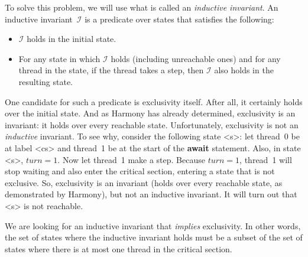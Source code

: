 \documentclass{report}
\begin{document}
To solve this problem, we will use what is called an
\emph{inductive invariant}.
%
An inductive invariant~$\mathcal{I}$ is a predicate over states that satisfies the following:
\begin{itemize}
\item $\mathcal{I}$ holds in the initial state.
\item For any state in which $\mathcal{I}$ holds (including unreachable ones) and for any
thread in the state, if the thread takes a step, then $\mathcal{I}$ also holds in the
resulting state.
\end{itemize}

One candidate for such a predicate is exclusivity itself.
After all, it certainly holds over the initial state.
And as Harmony has already determined, exclusivity is an invariant:
it holds over every reachable state.
Unfortunately, exclusivity is not an \emph{inductive} invariant.
To see why, consider the following state <{s}>: let thread~0 be at label <{cs}>
and thread~1 be at the start of the \textbf{await} statement.
Also, in state <{s}>, $\mathit{turn} = 1$.  Now let
thread~1 make a step.  Because $\mathit{turn} = 1$,
thread~1 will stop waiting and also enter the critical
section, entering a state that is not exclusive.
So, exclusivity is an invariant (holds over every reachable state, as demonstrated
by Harmony),
but not an inductive invariant.
It will turn out that <{s}> is not reachable.

We are looking for an inductive invariant that \emph{implies} exclusivity.
In other words, the set of states where the inductive invariant holds
must be a subset of the set of states where there is at most one thread in
the critical section.
\end{document}
